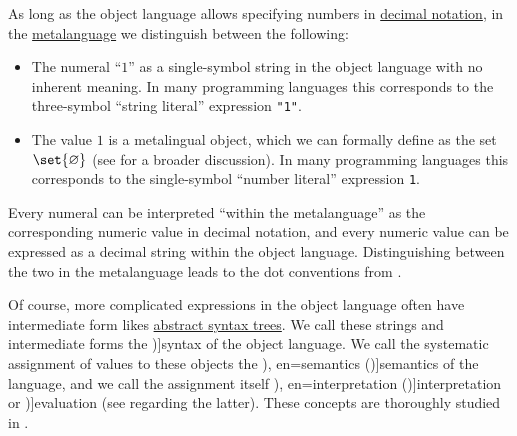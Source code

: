 \begin{concept}\label{con:syntax_and_semantics}
  As long as the object language allows specifying numbers in \hyperref[rem:decimal_notation_grammar]{decimal notation}, in the \hyperref[con:metalanguage]{metalanguage} we distinguish between the following:
  \begin{itemize}
    \item The numeral \enquote{\( 1 \)} as a single-symbol string in the object language with no inherent meaning. In many programming languages this corresponds to the three-symbol \enquote{string literal} expression \texttt{"1"}.

    \item The value \( 1 \) is a metalingual object, which we can formally define as the set \( \set{ \varnothing } \) (see  for a broader discussion). In many programming languages this corresponds to the single-symbol \enquote{number literal} expression \texttt{1}.
  \end{itemize}

  Every numeral can be interpreted \enquote{within the metalanguage} as the corresponding numeric value in decimal notation, and every numeric value can be expressed as a decimal string within the object language. Distinguishing between the two in the metalanguage leads to the dot conventions from .

  Of course, more complicated expressions in the object language often have intermediate form likes \hyperref[con:abstract_syntax_tree]{abstract syntax trees}. We call these strings and intermediate forms the \term[en=syntax (\cite[8]{Hinman2005})]{syntax} of the object language. We call the systematic assignment of values to these objects the \term[ru=семантика (\cite[54]{КолмогоровДрагалин2006}), en=semantics (\cite[8]{Hinman2005})]{semantics} of the language, and we call the assignment itself \term[ru=интерпретация (\cite[17]{Герасимов2011}), en=interpretation (\cite[10]{Smullyan1995})]{interpretation} or \term[ru=оценка (\cite[77]{ШеньВерещагин2017Языки})]{evaluation} (see  regarding the latter). These concepts are thoroughly studied in .
\end{concept}

